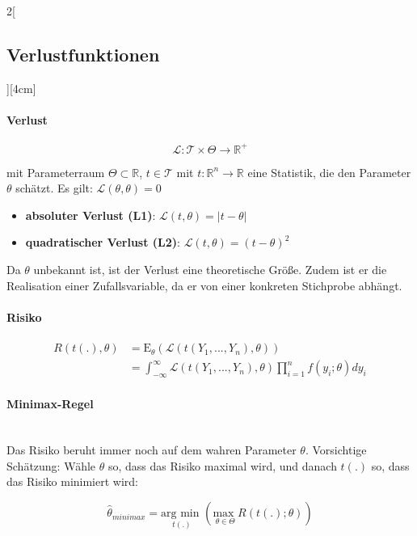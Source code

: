 \documentclass[8pt]{extarticle}
\begin{document}
\begin{multicols}{2}[\subsection{Verlustfunktionen}][4cm]

\paragraph{Verlust}

$$\mathcal{L}: \mathcal{T} \times \Theta \rightarrow \mathbb{R}^+$$

\noindent mit Parameterraum $\Theta \subset \mathbb{R}$, $t\in \mathcal{T}$ mit $t:\mathbb{R}^n \rightarrow \mathbb{R}$ eine Statistik, die den Parameter $\theta$ schätzt. 
Es gilt: $\mathcal{L}(\theta, \theta) = 0$

\begin{itemize}
\item \textbf{absoluter Verlust (L1)}: $\mathcal{L}(t, \theta) = \left|t-\theta \right|$
\item \textbf{quadratischer Verlust (L2)}: $\mathcal{L}(t, \theta) = (t-\theta)^2$
\end{itemize}

\noindent Da $\theta$ unbekannt ist, ist der Verlust eine theoretische Größe. Zudem ist er die Realisation einer Zufallsvariable, da er von einer konkreten Stichprobe abhängt.

\paragraph{Risiko}

\begin{align*}
R(t(.), \theta) &= \mathrm{E}_\theta \left(\mathcal{L}(t(Y_1,...,Y_n),\theta)\right) \\
&= \int_{-\infty}^\infty \mathcal{L}(t(Y_1,...,Y_n),\theta) \prod_{i=1}^n f(y_i;\theta)dy_i
\end{align*}

\paragraph{Minimax-Regel} \ \\
\noindent Das Risiko beruht immer noch auf dem wahren Parameter $\theta$.
Vorsichtige Schätzung: Wähle $\theta$ so, dass das Risiko maximal wird, und danach $t(.)$ so, dass das Risiko minimiert wird:

$$\hat{\theta}_{minimax} = \underset{t(.)}{\text{arg min }} \left(\underset{\theta \in \Theta}{\text{max }} R(t(.);\theta)\right)$$


\end{multicols}
\end{document}
